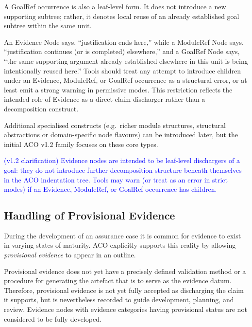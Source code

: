 \documentclass[11pt,twoside,a4paper]{article}
\begin{document}
A GoalRef occurrence is also a leaf-level form. It does not introduce a new supporting subtree; rather, it denotes local reuse of an already established goal subtree within the same unit.

An Evidence Node says, ``justification ends here,'' while a ModuleRef Node says, ``justification continues (or is completed) elsewhere,'' and a GoalRef Node says, ``the same supporting argument already established elsewhere in this unit is being intentionally reused here.''
Tools should treat any attempt to introduce children under an Evidence, ModuleRef, or GoalRef occurrence as a
structural error, or at least emit a strong warning in permissive modes.
This restriction reflects the intended role of Evidence as a direct claim discharger
rather than a decomposition construct.

Additional specialised constructs (e.g.\ richer module structures, structural abstractions or domain-specific node flavours) can be introduced later, but the initial ACO v1.2 family focuses on these core types.

\textcolor{blue}{(v1.2 clarification) Evidence nodes are intended to be leaf-level dischargers of a goal: they do not introduce further decomposition structure beneath themselves in the ACO indentation tree. Tools may warn (or treat as an error in strict modes) if an Evidence, ModuleRef, or GoalRef occurrence has children.}

\subsection{Handling of Provisional Evidence}
\label{sec:provisional-evidence}

During the development of an assurance case it is common for evidence to exist in
varying states of maturity. ACO explicitly supports this reality by allowing
\emph{provisional evidence} to appear in an outline.

Provisional evidence does not yet have a precisely defined validation method or a procedure for generating the artefact that is to serve as the evidence datum.
Therefore, provisional evidence is not yet fully accepted as discharging
the claim it supports, but is nevertheless recorded to guide development,
planning, and review. Evidence nodes with evidence categories having provisional status are not considered to be fully developed.
\end{document}
